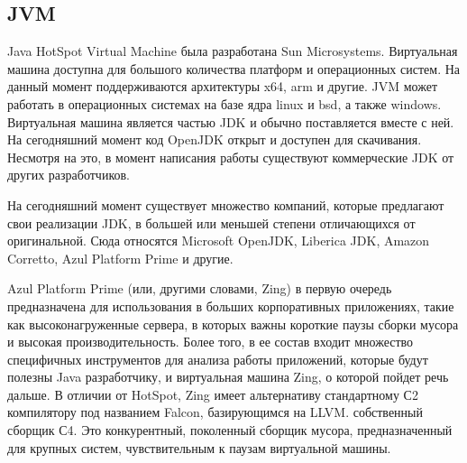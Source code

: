 \subsection{JVM}
Java HotSpot Virtual Machine была разработана Sun Microsystems. Виртуальная машина доступна для большого количества платформ и операционных систем. На данный момент поддерживаются архитектуры x64, arm и другие. JVM может работать в операционных системах на базе ядра linux и bsd, а также windows. Виртуальная машина является частью JDK и обычно поставляется вместе с ней. На сегодняшний момент код OpenJDK открыт и доступен для скачивания. Несмотря на это, в момент написания работы существуют коммерческие JDK от других разработчиков.
\par
На сегодняшний момент существует множество компаний, которые предлагают свои реализации JDK, в большей или меньшей степени отличающихся от оригинальной. Сюда относятся Microsoft OpenJDK, Liberica JDK, Amazon Corretto, Azul Platform Prime и другие.
\par
Azul Platform Prime (или, другими словами, Zing) в первую очередь предназначена для использования в больших корпоративных приложениях, такие как высоконагруженные сервера, в которых важны короткие паузы сборки мусора и высокая производительность. 
Более того, в ее состав входит множество специфичных инструментов для анализа работы приложений, которые будут полезны Java разработчику, и виртуальная машина Zing, о которой пойдет речь дальше. В отличии от HotSpot, Zing имеет альтернативу стандартному С2 компилятору под названием Falcon, базирующимся на LLVM. собственный сборщик С4. Это конкурентный, поколенный сборщик мусора\cite{C4-perf}, предназначенный для крупных систем, чувствительным к паузам виртуальной машины.

